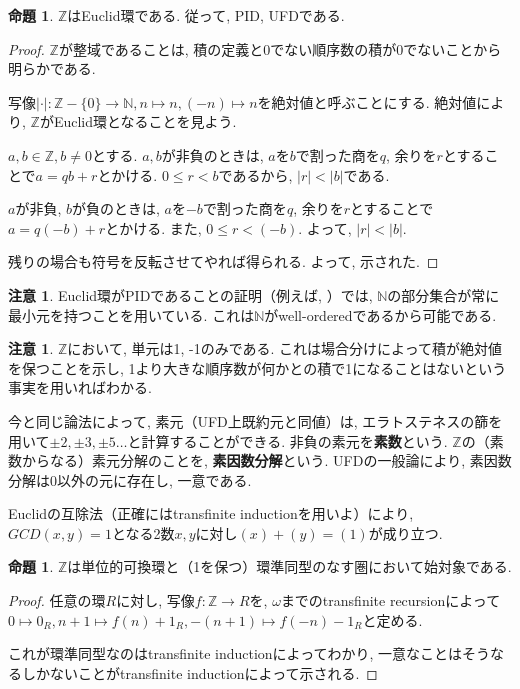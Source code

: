 \documentclass[a4paper, twoside]{bxjsarticle}
\newcommand{\nat}{\mathbb{N}}
\newcommand{\zah}{\mathbb{Z}}
\newcommand{\abs}[1]{\left\lvert#1\right\rvert}
\theoremstyle{definition}
\newtheorem{prop}[thm]{命題}
\newtheorem{rem}[thm]{注意}
\begin{document}
        \begin{prop}
            $\zah$はEuclid環である. 従って, PID, UFDである.
        \end{prop}
        \begin{proof}
            $\zah$が整域であることは, 積の定義と0でない順序数の積が0でないことから明らかである.
            
            写像$\abs{\cdot}\colon\zah-\{0\}\to\nat, n\mapsto n, (-n)\mapsto n$を絶対値と呼ぶことにする. 絶対値により, $\zah$がEuclid環となることを見よう.
            
            $a, b\in \zah, b\neq 0$とする. $a, b$が非負のときは, $a$を$b$で割った商を$q$, 余りを$r$とすることで$a=qb+r$とかける. $0\leq r<b$であるから, $\abs{r}<\abs{b}$である.
            
            $a$が非負, $b$が負のときは, $a$を$-b$で割った商を$q$, 余りを$r$とすることで$a=q(-b)+r$とかける. また, $0\leq r<(-b)$. よって, $\abs{r}<\abs{b}$.
            
            残りの場合も符号を反転させてやれば得られる. よって, 示された.
        \end{proof}
        \begin{rem}
            Euclid環がPIDであることの証明（例えば, \cite{yukie}）では, $\nat$の部分集合が常に最小元を持つことを用いている. これは$\nat$がwell-orderedであるから可能である.
        \end{rem}
        \begin{rem}
            $\zah$において, 単元は1, -1のみである. これは場合分けによって積が絶対値を保つことを示し, 1より大きな順序数が何かとの積で1になることはないという事実を用いればわかる.
            
            今と同じ論法によって, 素元（UFD上既約元と同値）は, エラトステネスの篩を用いて$\pm 2, \pm 3, \pm 5\dots$と計算することができる. 非負の素元を\textbf{素数}という. $\zah$の（素数からなる）素元分解のことを, \textbf{素因数分解}という. UFDの一般論により, 素因数分解は$0$以外の元に存在し, 一意である.
            
            Euclidの互除法（正確にはtransfinite inductionを用いよ）により, $GCD(x, y)=1$となる2数$x, y$に対し$(x)+(y)=(1)$が成り立つ.
        \end{rem}
        \begin{prop}
            $\zah$は単位的可換環と（1を保つ）環準同型のなす圏において始対象である.
        \end{prop}
        \begin{proof}
            任意の環$R$に対し, 写像$f\colon \zah\to R$を, $\omega$までのtransfinite recursionによって$0\mapsto 0_R, n+1\mapsto f(n)+1_R, -(n+1)\mapsto f(-n)-1_R$と定める.
            
            これが環準同型なのはtransfinite inductionによってわかり, 一意なことはそうなるしかないことがtransfinite inductionによって示される.
        \end{proof}
\end{document}
